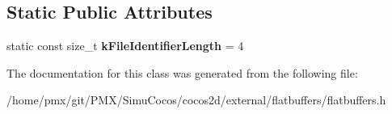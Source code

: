\subsection*{Static Public Attributes}
\begin{DoxyCompactItemize}
\item 
\mbox{\label{classflatbuffers_1_1FlatBufferBuilder_a2b7b7bbd959d70cd7cf0e466dd16b619}} 
static const size\+\_\+t {\bfseries k\+File\+Identifier\+Length} = 4
\end{DoxyCompactItemize}


The documentation for this class was generated from the following file\+:\begin{DoxyCompactItemize}
\item 
/home/pmx/git/\+P\+M\+X/\+Simu\+Cocos/cocos2d/external/flatbuffers/flatbuffers.\+h\end{DoxyCompactItemize}
